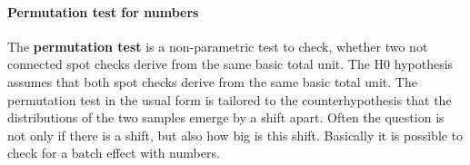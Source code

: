 \documentclass[]{article}
\newenvironment{Shaded}{\begin{snugshade}}{\end{snugshade}}
\newcommand{\KeywordTok}[1]{\textcolor[rgb]{0.13,0.29,0.53}{\textbf{#1}}}
\newcommand{\DataTypeTok}[1]{\textcolor[rgb]{0.13,0.29,0.53}{#1}}
\newcommand{\DecValTok}[1]{\textcolor[rgb]{0.00,0.00,0.81}{#1}}
\newcommand{\StringTok}[1]{\textcolor[rgb]{0.31,0.60,0.02}{#1}}
\newcommand{\CommentTok}[1]{\textcolor[rgb]{0.56,0.35,0.01}{\textit{#1}}}
\newcommand{\ControlFlowTok}[1]{\textcolor[rgb]{0.13,0.29,0.53}{\textbf{#1}}}
\newcommand{\OperatorTok}[1]{\textcolor[rgb]{0.81,0.36,0.00}{\textbf{#1}}}
\newcommand{\NormalTok}[1]{#1}
\let\oldparagraph\paragraph
\renewcommand{\paragraph}[1]{\oldparagraph{#1}\mbox{}}
\begin{document}
\paragraph{Permutation test for
numbers}\label{permutation-test-for-numbers}

The \textbf{permutation test} is a non-parametric test to check, whether
two not connected spot checks derive from the same basic total unit. The
H0 hypothesis assumes that both spot checks derive from the same basic
total unit. The permutation test in the usual form is tailored to the
counterhypothesis that the distributions of the two samples emerge by a
shift apart. Often the question is not only if there is a shift, but
also how big is this shift. Basically it is possible to check for a
batch effect with numbers.

\begin{Shaded}
\end{Shaded}
\end{document}
